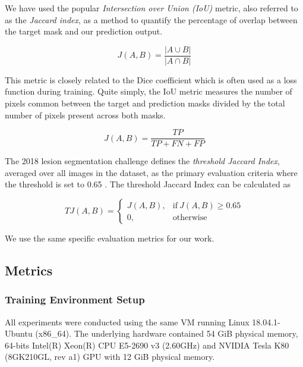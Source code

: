 We have used the popular \emph{Intersection over Union (IoU)} metric, also referred to as the \emph{Jaccard index}, as a method to quantify the percentage of overlap between the target mask and our prediction output.

\begin{equation}
  J(A, B) = \frac{|A \cup B|}{|A \cap B|}
\end{equation}

This metric is closely related to the Dice coefficient which is often used as a loss function during training. Quite simply, the IoU metric measures the number of pixels common between the target and prediction masks divided by the total number of pixels present across both masks.

\begin{equation}
  J(A, B) = \frac{TP}{TP + FN + FP}
\end{equation}


The 2018 lesion segmentation challenge defines the \emph{threshold Jaccard Index}, averaged over all images in the dataset, as the primary evaluation criteria where the threshold is set to 0.65 \citep{challenge-2018-codella}. The threshold Jaccard Index can be calculated as

\begin{equation}
  TJ(A, B) = \begin{cases}
      J(A, B), & \text{if}\ J(A, B) \geq{0.65} \\
      0, & \text{otherwise}
    \end{cases}
\end{equation}

We use the same specific evaluation metrics for our work.


\subsection{Metrics}

\subsubsection{Training Environment Setup}

All experiments were conducted using the same VM running Linux 18.04.1-Ubuntu (x86\_64). The underlying hardware contained 54 GiB physical memory, 64-bits Intel(R) Xeon(R) CPU E5-2690 v3 (2.60GHz) and NVIDIA Tesla K80 (8GK210GL, rev a1) GPU with 12 GiB physical memory.

